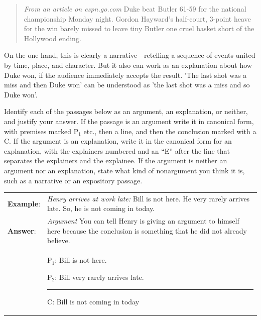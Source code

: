\begin{quotation} \noindent\textit{From an article on espn.go.com} Duke beat Butler 61-59 for the national championship Monday night. Gordon Hayward's half-court, 3-point heave for the win barely missed to leave tiny Butler one cruel basket short of the Hollywood ending. \end{quotation}

On the one hand, this is clearly a narrative---retelling a sequence of events united by time, place, and character. But it also can work as an explanation about how Duke won, if the audience immediately accepts the result. 'The last shot was a miss\textit{ }and then Duke won' can be understood as 'the last shot was a miss and so Duke won'.

\practiceproblems 
\problempart Identify each of the passages below as an argument, an explanation, or neither, and justify your answer. If the passage is an argument write it in canonical form, with premises marked P$_1$ etc., then a line, and then the conclusion marked with a C. If the argument is an explanation, write it in the canonical form for an explanation, with the explainers numbered and an ``E'' after the line that separates the explainers and the explainee. If the argument is neither an argument nor an explanation, state what kind of nonargument you think it is, such as a narrative or an expository passage.
 
\begin{longtabu}{p{.1\linewidth}p{.9\linewidth}}
\textbf{Example}: & \textit{Henry arrives at work late: }Bill is not here. He very rarely arrives late. So, he is not coming in today. \\
\textbf{Answer}: & \textit{Argument} You can tell Henry is giving an argument to himself here because the conclusion is something that he did not already believe. \\
&\begin{earg}
\item[P$_1$:] Bill is not here. 
\item[P$_2$:] Bill very rarely arrives late. 
\vspace{-.5em}
\item [] \rule{0.6\linewidth}{.5pt} 
\item[C:] Bill is not coming in today
\end{earg} 
\end{longtabu}

